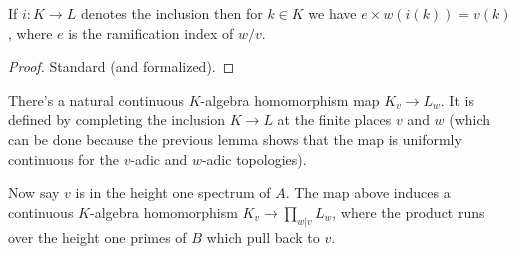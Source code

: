 \begin{lemma} If $i:K\to L$ denotes the inclusion then for $k\in K$ we have
  $e\times w(i(k))=v(k)$, where $e$ is the ramification index of $w/v$.
  \label{IsDedekindDomain.HeightOneSpectrum.valuation_comap}
  \leanok
\end{lemma}
\begin{proof}
  \leanok
  Standard (and formalized).
\end{proof}

\begin{definition}
  \label{IsDedekindDomain.HeightOneSpectrum.adicCompletionComapAlgHom}
  \leanok
  There's a natural continuous $K$-algebra homomorphism map $K_v\to L_w$. It is defined by completing
  the inclusion $K\to L$ at the finite places $v$ and $w$ (which can be done
  because the previous lemma shows that the map is uniformly continuous for the $v$-adic
  and $w$-adic topologies).
\end{definition}

Now say $v$ is in the height one spectrum of $A$. The map above induces a continuous
$K$-algebra homomorphism $K_v\to\prod_{w|v}L_w$, where the product runs over the height one
primes of $B$ which pull back to $v$.


